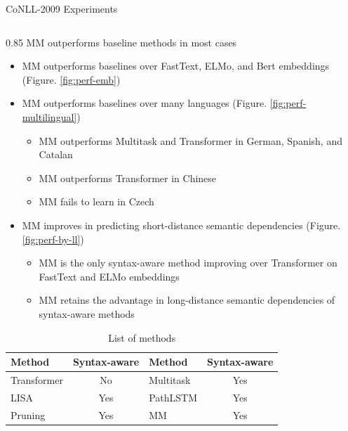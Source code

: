 \begin{exampleblock}{CoNLL-2009 Experiments}

\begin{column}{0.85\colwidth}
MM outperforms baseline methods in most cases
\begin{itemize}
    \item MM outperforms baselines over FastText, ELMo, and Bert embeddings (Figure. \ref{fig:perf-emb})
    \item MM outperforms baselines over many languages (Figure. \ref{fig:perf-multilingual})
    \begin{itemize}
        \item MM outperforms Multitask and Transformer in German, Spanish, and Catalan
        \item MM outperforms Transformer in Chinese
        \item MM fails to learn in Czech
    \end{itemize}
\item MM improves in predicting short-distance semantic dependencies (Figure. \ref{fig:perf-by-ll})
    \begin{itemize}
        \item MM is the only syntax-aware method improving over Transformer on FastText and ELMo embeddings
        \item MM retains the advantage in long-distance semantic dependencies of syntax-aware methods
    \end{itemize}
\end{itemize}

\begin{table}[]
\centering
\small
\begin{tabular}{l|c||l|c}
\toprule
Method & Syntax-aware & Method & Syntax-aware  \\
\midrule
Transformer   & No  &  Multitask       & Yes   \\
LISA\cite{strubell-etal-2018-linguistically}     & Yes & PathLSTM\cite{roth-lapata-2016-neural}   & Yes  \\
Pruning\cite{he-etal-2018-syntax} & Yes & MM & Yes \\
\bottomrule
\end{tabular}
\caption{List of methods}
\end{table}


\end{column}
\end{exampleblock}
